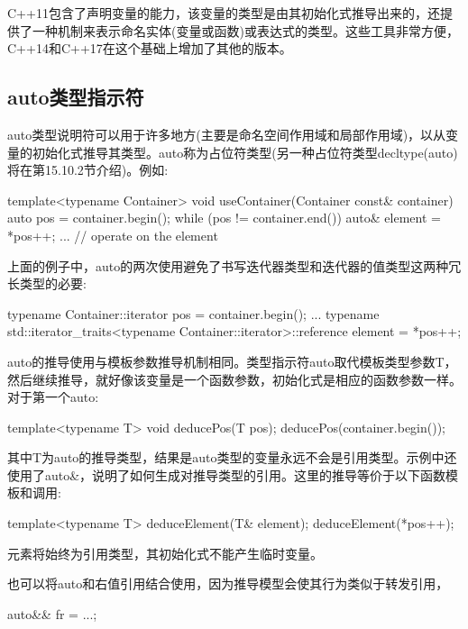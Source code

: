 
C++11包含了声明变量的能力，该变量的类型是由其初始化式推导出来的，还提供了一种机制来表示命名实体(变量或函数)或表达式的类型。这些工具非常方便，C++14和C++17在这个基础上增加了其他的版本。

\subsection{auto类型指示符}

auto类型说明符可以用于许多地方(主要是命名空间作用域和局部作用域)，以从变量的初始化式推导其类型。auto称为占位符类型(另一种占位符类型decltype(auto)将在第15.10.2节介绍)。例如:

\begin{cpp}
template<typename Container>
void useContainer(Container const& container)
{
	auto pos = container.begin();
	while (pos != container.end()) {
		auto& element = *pos++;
		... // operate on the element
	}
}
\end{cpp}

上面的例子中，auto的两次使用避免了书写迭代器类型和迭代器的值类型这两种冗长类型的必要:

\begin{cpp}
typename Container::iterator pos = container.begin();
...
typename std::iterator_traits<typename Container::iterator>::reference
	element = *pos++;
\end{cpp}

auto的推导使用与模板参数推导机制相同。类型指示符auto取代模板类型参数T，然后继续推导，就好像该变量是一个函数参数，初始化式是相应的函数参数一样。对于第一个auto:

\begin{cpp}
template<typename T> void deducePos(T pos);
deducePos(container.begin());
\end{cpp}

其中T为auto的推导类型，结果是auto类型的变量永远不会是引用类型。示例中还使用了auto\&，说明了如何生成对推导类型的引用。这里的推导等价于以下函数模板和调用:

\begin{cpp}
template<typename T> deduceElement(T& element);
deduceElement(*pos++);
\end{cpp}

元素将始终为引用类型，其初始化式不能产生临时变量。

也可以将auto和右值引用结合使用，因为推导模型会使其行为类似于转发引用，

\begin{cpp}
auto&& fr = ...;
\end{cpp}

